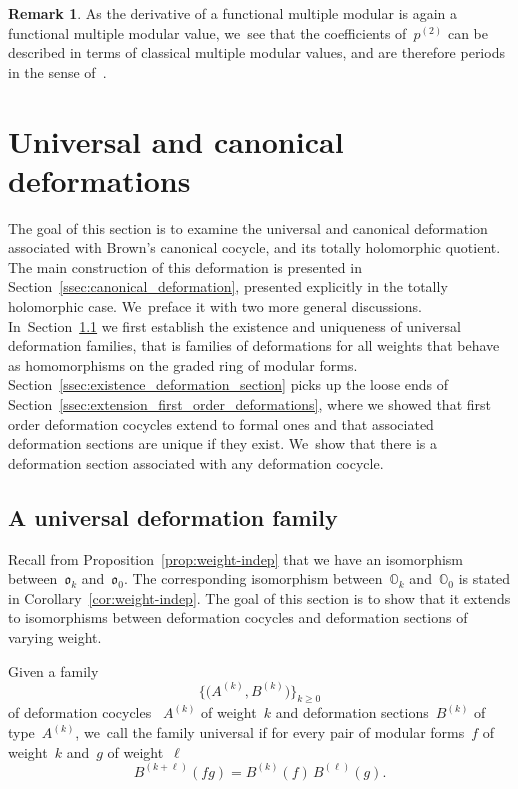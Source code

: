 \documentclass[JEP,XML,SOM,Unicode,published]{cedram}
\theoremstyle{plain}
\theoremstyle{definition}
\newtheorem{remark}[theoremcounter]{Remark}
\newcommand{\tx}{\text}
\newcommand{\bbO}{\ensuremath{\mathbb{O}}}
\newcommand{\frako}{\ensuremath{\mathfrak{o}}}
\begin{document}
\begin{remark}
As the derivative of a functional multiple modular is again a functional multiple modular value, we~see that the coefficients of~$p^{(2)}$ can be described in terms of classical multiple modular values, and are therefore periods in the sense of~\cite{kontsevich-zagier-2001}.
\end{remark}

\section{Universal and canonical deformations}
\label{sec:universal_canonical}

The goal of this section is to examine the universal and canonical deformation associated with Brown's canonical cocycle, and its totally holomorphic quotient. The main construction of this deformation is presented in Section~\ref{ssec:canonical_deformation}, presented explicitly in the totally holomorphic case. We~preface it with two more general discussions. In~Section~\ref{ssec:universal_deformation} we first establish the existence and uniqueness of universal deformation families, that is families of deformations for all weights that behave as homomorphisms on the graded ring of modular forms. Section~\ref{ssec:existence_deformation_section} picks up the loose ends of Section~\ref{ssec:extension_first_order_deformations}, where we showed that first order deformation cocycles extend to formal ones and that associated deformation sections are unique if they exist. We~show that there is a deformation section associated with any deformation cocycle.

\subsection{A universal deformation family}
\label{ssec:universal_deformation}

Recall from Proposition~\ref{prop:weight-indep} that we have an isomorphism between~$\frako_k$ and~$\frako_0$. The corresponding isomorphism between~$\bbO_k$ and~$\bbO_0$ is stated in Corollary~\ref{cor:weight-indep}. The goal of this section is to show that it extends to isomorphisms between deformation cocycles and deformation sections of varying weight.

Given a family
\begin{equation*}
\big\{ \bigl(A^{(k)},B^{(k)} \bigr) \big\}_{k\geq 0}
\end{equation*}
of deformation cocycles ~$A^{(k)}$ of weight~$k$ and deformation sections~$B^{(k)}$ of type~$A^{(k)}$, we~call the family universal if for every pair of modular forms~$f$ of weight~$k$ and~$g$ of weight~$\ell$
\begin{equation*}
B^{(k+\ell)}(fg)
=
B^{(k)}(f)\, B^{(\ell)}(g)
\tx{.}
\end{equation*}
\end{document}
